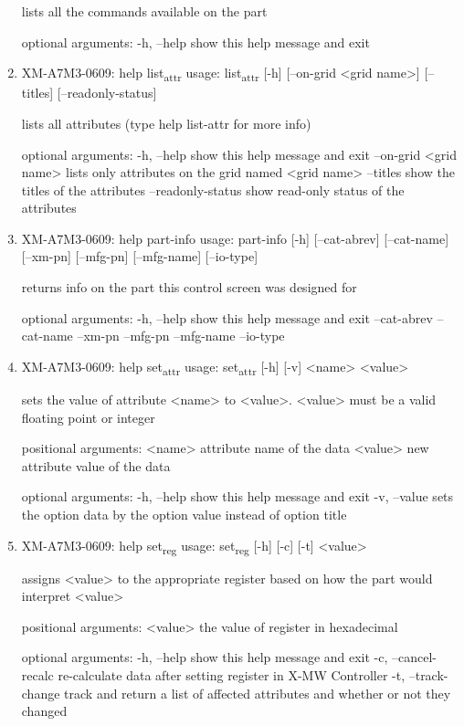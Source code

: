 \documentclass[11pt]{article}
\begin{document}
\begin{enumerate}
lists all the commands available on the part

optional arguments:
  -h, --help  show this help message and exit

\item XM-A7M3-0609: help list\textsubscript{attr}
\label{sec:orgddd45d6}
usage: list\textsubscript{attr} [-h] [--on-grid <grid name>] [--titles] [--readonly-status]

lists all attributes (type help list-attr for more info)

optional arguments:
  -h, --help            show this help message and exit
  --on-grid <grid name>
                        lists only attributes on the grid named <grid name>
  --titles              show the titles of the attributes
  --readonly-status     show read-only status of the attributes

\item XM-A7M3-0609: help part-info
\label{sec:org5918616}
usage: part-info  [-h] [--cat-abrev] [--cat-name] [--xm-pn] [--mfg-pn] [--mfg-name]
        [--io-type]

returns info on the part this control screen was designed for

optional arguments:
  -h, --help   show this help message and exit
  --cat-abrev
  --cat-name
  --xm-pn
  --mfg-pn
  --mfg-name
  --io-type

\item XM-A7M3-0609: help set\textsubscript{attr}
\label{sec:org2e5418e}
usage: set\textsubscript{attr} [-h] [-v] <name> <value>

sets the value of attribute <name> to <value>. <value> must be a valid
floating point or integer

positional arguments:
  <name>       attribute name of the data
  <value>      new attribute value of the data

optional arguments:
  -h, --help   show this help message and exit
  -v, --value  sets the option data by the option value instead of option
               title

\item XM-A7M3-0609: help set\textsubscript{reg}
\label{sec:orgc9122af}
usage: set\textsubscript{reg} [-h] [-c] [-t] <value>

assigns <value> to the appropriate register based on how the part would
interpret <value>

positional arguments:
  <value>              the value of register in hexadecimal

optional arguments:
  -h, --help           show this help message and exit
  -c, --cancel-recalc  re-calculate data after setting register in X-MW
                       Controller
  -t, --track-change   track and return a list of affected attributes and
                       whether or not they changed


\end{enumerate}
\end{document}
